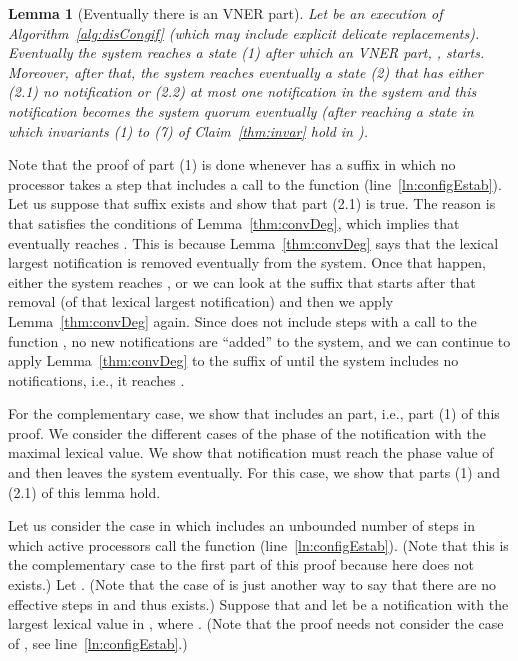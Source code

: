 \documentclass[11pt]{article}
\newtheorem{lemma}[theorem]{Lemma}
\newenvironment{proof}{\noindent{\bf Proof.}}{\hfill}
\begin{document}
\begin{lemma}[Eventually there is an VNER part]
\label{thm:virtuallyNotExplicit}
Let  be an execution of Algorithm~\ref{alg:disCongif} (which may include explicit delicate replacements). Eventually the system reaches a state (1)  after which an VNER part, , starts. Moreover, after that, the system reaches eventually a state (2)  that has either (2.1) no notification or (2.2) at most one notification in the system and this notification becomes the system quorum eventually (after reaching a state in which invariants (1) to (7) of Claim~\ref{thm:invar} hold in ). 
\end{lemma}
\begin{proof}
Note that the proof of part (1) is done whenever  has a suffix  in which no processor takes a step that includes a call to the function  (line~\ref{ln:configEstab}). Let us suppose that suffix  exists and show that part (2.1) is true. The reason is that  satisfies the conditions of Lemma~\ref{thm:convDeg}, which implies that eventually  reaches . This is because Lemma~\ref{thm:convDeg} says that the lexical largest notification is removed eventually from the system. Once that happen, either the system reaches , or we can look at the suffix  that starts after that removal (of that lexical largest notification) and then we apply Lemma~\ref{thm:convDeg} again. Since  does not include steps with a call to the function , no new notifications are ``added'' to the system, and we can continue to apply Lemma~\ref{thm:convDeg} to the suffix of  until the system includes no notifications, i.e., it reaches .



For the complementary case, we show that  includes an  part, i.e., part (1) of this proof. We consider the different cases of the phase of the notification with the maximal lexical value. We show that notification must reach the phase value of  and then leaves the system eventually. For this case, we show that parts (1) and (2.1) of this lemma hold.    

Let us consider the case in which  includes an unbounded number of steps in which active processors call the function  (line~\ref{ln:configEstab}).
(Note that this is the  complementary case to the first part of this proof because here  does not exists.) Let .
(Note that the case of  is just another way to say that there are no effective steps in  and thus  exists.)
Suppose that  and let  be a notification with the largest lexical value in , where . (Note that the proof needs not consider the case of , see line~\ref{ln:configEstab}.)


\end{proof}
\end{document}
